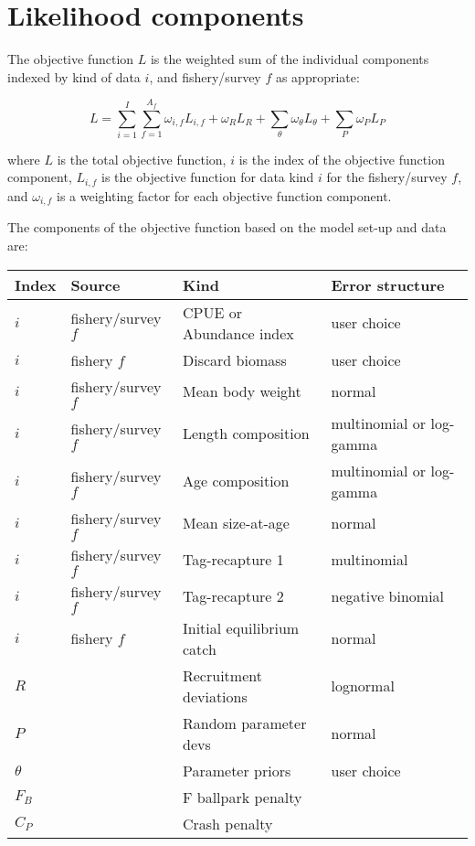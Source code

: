 \section{Likelihood components}

The objective function $L$ is the weighted sum of the individual components indexed by kind of data $i$, and fishery/survey $f$ as appropriate:

\begin{equation}
	L = \sum_{i=1}^{I}\sum_{f=1}^{A_f}\omega_{i,f} L_{i,f}+\omega_R L_R + \sum_{\theta}^{}\omega_\theta L_\theta + \sum_{P}^{}\omega_P L_P
\end{equation}

where $L$ is the total objective function, $i$ is the index of the objective function component, $L_{i,f}$ is the objective function for data kind $i$ for the fishery/survey $f$, and $\omega_{i,f}$ is a weighting factor for each objective function component.

The components of the objective function based on the model set-up and data are: 

\begin{longtable}{p{1cm} p{3.5cm} p{5.5cm} p{4.75cm}}
	Index & Source & Kind & Error structure\\
	\hline	
	$i$ & fishery/survey $f$ & CPUE or Abundance index & user choice \\
	$i$ & fishery $f$        & Discard biomass         & user choice \\
	$i$ & fishery/survey $f$ & Mean body weight        & normal \\
	$i$ & fishery/survey $f$ & Length composition      & multinomial or log-gamma \\
	$i$ & fishery/survey $f$ & Age composition         & multinomial or log-gamma \\
	$i$ & fishery/survey $f$ & Mean size-at-age        & normal \\
	$i$ & fishery/survey $f$ & Tag-recapture 1         & multinomial \\
	$i$ & fishery/survey $f$ & Tag-recapture 2         & negative binomial\\
	$i$ & fishery $f$        & Initial equilibrium catch & normal \\
	$R$ & 					 & Recruitment deviations  & lognormal \\
	$P$ & 					 & Random parameter devs   & normal \\
	$\theta$ & 				 & Parameter priors	       & user choice\\
	$F_B$ & 				 & F ballpark penalty	   &  \\
	$C_P$ &				     & Crash penalty           &  \\
	\hline
\end{longtable}

